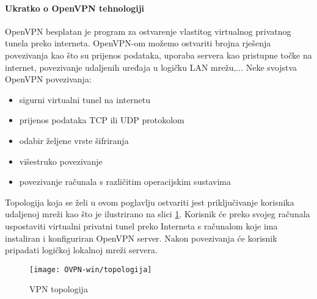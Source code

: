 \bigbreak
\paragraph*{Ukratko o OpenVPN tehnologiji}
\hfill \smallbreak

OpenVPN\cite{openvpn} besplatan je program za ostvarenje vlastitog virtualnog privatnog tunela preko interneta. OpenVPN-om možemo ostvariti brojna rješenja povezivanja kao što su prijenos podataka, uporaba servera kao pristupne točke na internet, povezivanje udaljenih uređaja u logičku LAN mrežu,...\smallbreak
Neke svojstva OpenVPN povezivanja:
\begin{itemize}
	\item sigurni virtualni tunel na internetu
	\item prijenos podataka TCP ili UDP protokolom
	\item odabir željene vrste šifriranja
	\item višestruko povezivanje
	\item povezivanje računala s različitim operacijskim sustavima
\end{itemize}
\smallbreak
Topologija koja se želi u ovom poglavlju ostvariti jest priključivanje korisnika udaljenoj mreži kao što je ilustrirano na slici \ref{fig:topologija-open}. Korisnik će preko svojeg računala uspostaviti virtualni privatni tunel preko Interneta s računalom koje ima instaliran i konfiguriran OpenVPN server. Nakon povezivanja će korisnik pripadati logičkoj lokalnoj mreži servera.
\begin{figure}[h!]
	\centering
     \texttt{[image: OVPN-win/topologija]}
     \caption{VPN topologija}
     \label{fig:topologija-open}
\end{figure}
\FloatBarrier
\bigbreak
